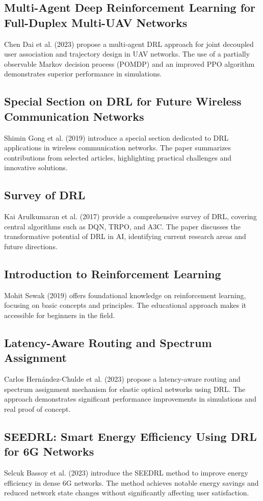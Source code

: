 \documentclass{article}
\begin{document}
\subsection{Multi-Agent Deep Reinforcement Learning for Full-Duplex Multi-UAV Networks}
Chen Dai et al. (2023) propose a multi-agent DRL approach for joint decoupled user association and trajectory design in UAV networks. The use of a partially observable Markov decision process (POMDP) and an improved PPO algorithm demonstrates superior performance in simulations.

\subsection{Special Section on DRL for Future Wireless Communication Networks}
Shimin Gong et al. (2019) introduce a special section dedicated to DRL applications in wireless communication networks. The paper summarizes contributions from selected articles, highlighting practical challenges and innovative solutions.

\subsection{Survey of DRL}
Kai Arulkumaran et al. (2017) provide a comprehensive survey of DRL, covering central algorithms such as DQN, TRPO, and A3C. The paper discusses the transformative potential of DRL in AI, identifying current research areas and future directions.

\subsection{Introduction to Reinforcement Learning}
Mohit Sewak (2019) offers foundational knowledge on reinforcement learning, focusing on basic concepts and principles. The educational approach makes it accessible for beginners in the field.

\subsection{Latency-Aware Routing and Spectrum Assignment}
Carlos Hernández-Chulde et al. (2023) propose a latency-aware routing and spectrum assignment mechanism for elastic optical networks using DRL. The approach demonstrates significant performance improvements in simulations and real proof of concept.

\subsection{SEEDRL: Smart Energy Efficiency Using DRL for 6G Networks}
Selcuk Bassoy et al. (2023) introduce the SEEDRL method to improve energy efficiency in dense 6G networks. The method achieves notable energy savings and reduced network state changes without significantly affecting user satisfaction.
\end{document}
